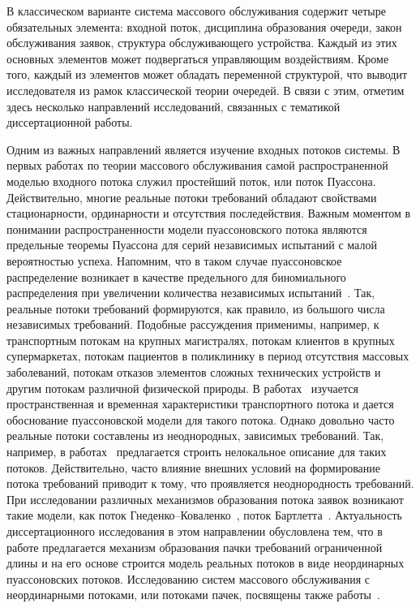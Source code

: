 В классическом варианте система массового обслуживания содержит четыре обязательных элемента: входной поток, дисциплина образования очереди, закон обслуживания заявок, структура обслуживающего устройства. Каждый из этих основных элементов может подвергаться управляющим воздействиям. Кроме того, каждый из элементов может обладать переменной структурой, что выводит исследователя из рамок классической теории очередей. В связи с этим, отметим здесь несколько направлений исследований, связанных с тематикой диссертационной работы.

Одним из важных направлений является изучение входных потоков системы. В первых работах по теории массового обслуживания самой распространенной моделью входного потока служил простейший поток, или поток Пуассона. Действительно, многие реальные потоки требований обладают свойствами стационарности, ординарности и отсутствия последействия. Важным моментом в понимании распространенности модели пуассоновского потока являются предельные теоремы Пуассона для серий независимых испытаний с малой вероятностью успеха. Напомним, что в таком  случае пуассоновское распределение возникает в качестве предельного для биномиального распределения при увеличении количества независимых испытаний~\cite{Kingman}. Так, реальные потоки требований формируются, как правило, из большого числа независимых требований. Подобные рассуждения применимы, например, к транспортным потокам на крупных магистралях, потокам клиентов в крупных супермаркетах, потокам пациентов в поликлинику в период отсутствия массовых заболеваний, потокам отказов элементов сложных технических устройств и другим потокам различной физической природы. В работах~\cite{Heit,Breiman1963} изучается пространственная и временная характеристики транспортного потока и дается обоснование пуассоновской модели для такого потока. Однако довольно часто реальные потоки составлены из неоднородных, зависимых требований. Так, например, в работах~\cite{FedotkinNonlocal,Fedotkin2012} предлагается строить нелокальное описание для таких потоков. Действительно, часто влияние внешних условий на формирование потока требований приводит к тому, что проявляется неоднородность требований. При исследовании различных механизмов образования потока заявок возникают такие модели, как поток Гнеденко--Коваленко~\cite{Fedotkin2013}, поток Бартлетта~\cite{Fedotkin1996}. Актуальность диссертационного исследования в этом направлении обусловлена тем, что в работе предлагается механизм образования пачки требований ограниченной длины и на его основе строится модель реальных потоков в виде неординарных пуассоновских потоков. Исследованию систем массового обслуживания с неординарными потоками, или потоками пачек, посвящены также работы~\cite{Foster1961,Pechinkin1990,Monsik2009,Monsik2010}. 

